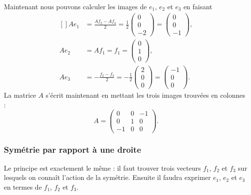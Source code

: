 Maintenant nous pouvons calculer les images de $e_1$, $e_2$ et $e_3$ en faisant
\begin{equation}
	\begin{aligned}[]
		Ae_1&=\frac{ Af_2-Af_3 }{ 2 }=\frac{1 }{2}\begin{pmatrix}
			0	\\ 
			0	\\ 
			-2	
		\end{pmatrix}=\begin{pmatrix}
			0	\\ 
			0	\\ 
			-1	
		\end{pmatrix},\\
		Ae_2&=Af_1=f_1=\begin{pmatrix}
			0	\\ 
			1	\\ 
			0	
		\end{pmatrix},\\
		Ae_3&=-\frac{ f_2-f_3 }{ 2 }=-\frac{ 1 }{2}\begin{pmatrix}
			2	\\ 
			0	\\ 
			0	
		\end{pmatrix}=\begin{pmatrix}
			-1	\\ 
			0	\\ 
			0	
		\end{pmatrix}.
	\end{aligned}
\end{equation}
La matrice $A$ s'écrit maintenant en mettant les trois images trouvées en colonnes :
\begin{equation}
	A=\begin{pmatrix}
		0	&	0	&	-1	\\
		0	&	1	&	0	\\
		-1	&	0	&	0
	\end{pmatrix}.
\end{equation}

\subsubsection{Symétrie par rapport à une droite}

Le principe est exactement le même : il faut trouver trois vecteurs $f_1$, $f_2$ et $f_3$ sur lesquels on connaît l'action de la symétrie. Ensuite il faudra exprimer $e_1$, $e_2$ et $e_3$ en termes de $f_1$, $f_2$ et $f_3$.

